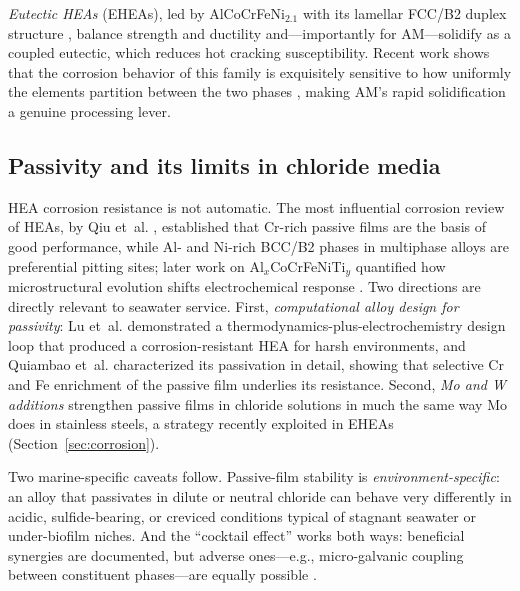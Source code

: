 \emph{Eutectic HEAs} (EHEAs), led by AlCoCrFeNi$_{2.1}$ with its lamellar FCC/B2 duplex structure \cite{lu2014ehea}, balance strength and ductility and---importantly for AM---solidify as a coupled eutectic, which reduces hot cracking susceptibility. Recent work shows that the corrosion behavior of this family is exquisitely sensitive to how uniformly the elements partition between the two phases \cite{slm_ehea_2025}, making AM's rapid solidification a genuine processing lever.

\subsection{Passivity and its limits in chloride media}

HEA corrosion resistance is not automatic. The most influential corrosion review of HEAs, by Qiu et~al. \cite{qiu2017}, established that Cr-rich passive films are the basis of good performance, while Al- and Ni-rich BCC/B2 phases in multiphase alloys are preferential pitting sites; later work on Al$_x$CoCrFeNiTi$_y$ quantified how microstructural evolution shifts electrochemical response \cite{qiu2019}. Two directions are directly relevant to seawater service. First, \emph{computational alloy design for passivity}: Lu et~al. \cite{lu2018design} demonstrated a thermodynamics-plus-electrochemistry design loop that produced a corrosion-resistant HEA for harsh environments, and Quiambao et~al. \cite{quiambao2019} characterized its passivation in detail, showing that selective Cr and Fe enrichment of the passive film underlies its resistance. Second, \emph{Mo and W additions} strengthen passive films in chloride solutions in much the same way Mo does in stainless steels, a strategy recently exploited in EHEAs (Section~\ref{sec:corrosion}).

Two marine-specific caveats follow. Passive-film stability is \emph{environment-specific}: an alloy that passivates in dilute or neutral chloride can behave very differently in acidic, sulfide-bearing, or creviced conditions typical of stagnant seawater or under-biofilm niches. And the ``cocktail effect'' works both ways: beneficial synergies are documented, but adverse ones---e.g., micro-galvanic coupling between constituent phases---are equally possible \cite{qiu2017,nass2025marine}.
